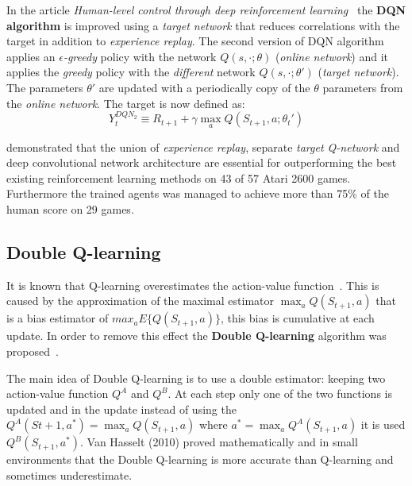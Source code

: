 In the article \textit{Human-level control through deep reinforcement learning}~\cite{Mnih2015} the \textbf{DQN algorithm} is improved using a \textit{target network} that reduces correlations with the target in addition to \textit{experience replay}.
The second version of DQN algorithm applies an \textit{$\epsilon$-greedy} policy with the network $Q(s, \cdotp; \theta)$ (\textit{online network}) and it applies the \textit{greedy} policy with the \emph{different} network $Q(s, \cdotp; \theta')$ (\textit{target network}). The parameters $\theta'$ are updated with a periodically copy of the $\theta$ parameters from the \textit{online network}. The target is now defined as:
\begin{equation}
Y^{DQN_2}_t \equiv R_{t+1} + \gamma \max_{a} Q(S_{t+1}, a; \theta_t')
\end{equation}

\citeauthor{Mnih2015}  demonstrated that the union of \textit{experience replay}, separate \textit{target Q-network} and deep convolutional network architecture are essential for outperforming the best existing reinforcement learning methods on 43 of 57 Atari 2600 games. Furthermore the trained agents was managed to achieve more than 75\% of the human score on 29 games.



\subsection{Double Q-learning}
\label{subsec:DoubleQlearning}

It is known that Q-learning overestimates the action-value function~\cite{NIPS2010_3964}. This is caused by the approximation of the maximal estimator $\max_a Q(S_{t+1}, a)$ that is a bias estimator of $max_a E \{ Q(S_{t+1}, a) \}$, this bias is cumulative at each update. In order to remove this effect the \textbf{Double Q-learning} algorithm was proposed~\cite{NIPS2010_3964}.

The main idea of Double Q-learning is to use a double estimator: keeping two action-value function $Q^A$ and $Q^B$. At each step only one of the two functions is updated and in the update instead of using the $Q^A(S{t+1}, a^*) = \max_a Q(S_{t+1}, a)$ where $a^* = \max_a Q^A(S_{t+1}, a)$ it is used $Q^B(S_{t+1}, a^*)$.
Van Hasselt (2010) proved mathematically and in small environments that the Double Q-learning is more accurate than Q-learning and sometimes underestimate.
\
